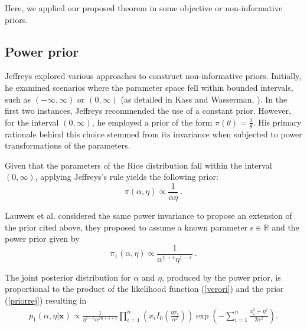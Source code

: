 \documentclass[12pt]{interact}
\theoremstyle{plain}%
\theoremstyle{definition}
\theoremstyle{remark}
\begin{document}
Here, we applied our proposed theorem in some objective or non-informative priors.

\subsection{Power prior}

Jeffreys explored various approaches to construct non-informative priors. Initially, he examined scenarios where the parameter space fell within bounded intervals, such as $(-\infty,\infty)$ or $(0,\infty)$ (as detailed in Kass and Wasserman, \cite{kass1996selection}). In the first two instances, Jeffreys recommended the use of a constant prior. However, for the interval $(0,\infty)$, he employed a prior of the form $\pi(\theta)=\frac{1}{\theta}$. His primary rationale behind this choice stemmed from its invariance when subjected to power transformations of the parameters.

Given that the parameters of the Rice distribution fall within the interval $(0,\infty)$, applying Jeffreys's rule yields the following prior:
\begin{equation}\label{priorrej}
\pi\left(\alpha,\eta\right)\propto \frac{1}{\alpha\eta} \ .
\end{equation}

Lauwers et al. \cite{lauwers2009estimating} considered the same power invariance to propose an extension of the prior cited above, they proposed to assume a known parameter $\epsilon\in\mathbb{R}$ and the power prior given by
\begin{equation}\label{priorrej}
\pi_1\left(\alpha,\eta\right)\propto \frac{1}{\alpha^{1+\epsilon}\eta^{1-\epsilon}} \ .
\end{equation}

The joint posterior distribution for $\alpha$ and $\eta$, produced by the power prior, is proportional to the product of the likelihood function (\ref{verori}) and the prior (\ref{priorrej}) resulting in
\begin{equation}\label{postgpower} 
\begin{aligned}
p_1(\alpha,\eta|\boldsymbol{x})\propto \frac{1}{\eta^{1-\epsilon}\alpha^{2n+1+\epsilon}}\prod_{i=1}^{n}\left(x_iI_0\left( \frac{\eta x_i}{\alpha^2} \right)\right) \exp\left( -\sum_{i=1}^{n}\frac{x_i^2 + \eta^2}{2\alpha^2} \right).
\end{aligned}
\end{equation}
\end{document}

